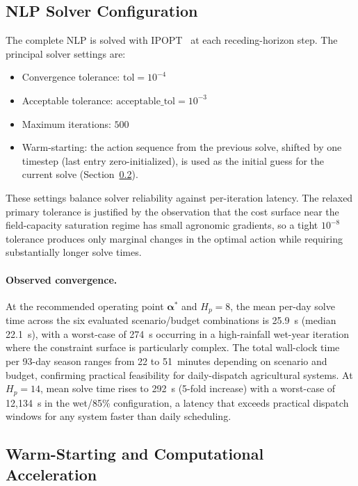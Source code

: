 \subsection{NLP Solver Configuration}
\label{ssec:ctrl-solver}

The complete NLP is solved with IPOPT~\cite{wachter2006ipopt} at each
receding-horizon step. The principal solver settings are:
\begin{itemize}
  \item Convergence tolerance: $\mathrm{tol} = 10^{-4}$
  \item Acceptable tolerance: $\mathrm{acceptable\_tol} = 10^{-3}$
  \item Maximum iterations: $500$
  \item Warm-starting: the action sequence from the previous solve, shifted
    by one timestep (last entry zero-initialized), is used as the
    initial guess for the current solve (Section~\ref{ssec:ctrl-warmstart}).
\end{itemize}
These settings balance solver reliability against per-iteration latency. The
relaxed primary tolerance is justified by the observation that the cost
surface near the field-capacity saturation regime has small agronomic
gradients, so a tight $10^{-8}$ tolerance produces only marginal changes
in the optimal action while requiring substantially longer solve times.

\paragraph{Observed convergence.}
At the recommended operating point $\boldsymbol{\alpha}^*$ and $H_p = 8$,
the mean per-day solve time across the six evaluated scenario/budget
combinations is 25.9~s (median 22.1~s), with a worst-case of 274~s occurring
in a high-rainfall wet-year iteration where the constraint surface is
particularly complex. The total wall-clock time per 93-day season ranges
from 22 to 51~minutes depending on scenario and budget, confirming practical
feasibility for daily-dispatch agricultural systems. At $H_p = 14$, mean
solve time rises to 292~s (5-fold increase) with a worst-case of 12{,}134~s
in the wet/85\% configuration, a latency that exceeds practical dispatch
windows for any system faster than daily scheduling.

\subsection{Warm-Starting and Computational Acceleration}
\label{ssec:ctrl-warmstart}


